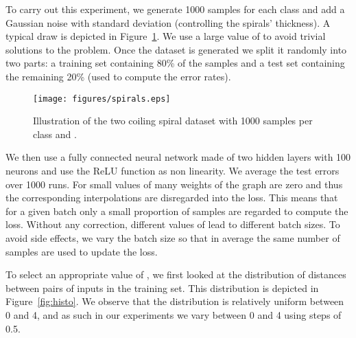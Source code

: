 \documentclass[twoside]{article}
\numberwithin{intassumption}{assumption}
\begin{document}
To carry out this experiment, we generate 1000 samples for each class and add a Gaussian noise with standard deviation  (controlling the spirals' thickness). A typical draw is depicted in Figure~\ref{fig:spirals}. We use a large value of  to avoid trivial solutions to the problem. Once the dataset is generated we split it randomly into two parts: a training set containing 80\% of the samples and a test set containing the remaining 20\% (used to compute the error rates).
\begin{figure}
    \centering
    \texttt{[image: figures/spirals.eps]}
    \caption{Illustration of the two coiling spiral dataset with 1000 samples per class and .}
    \label{fig:spirals}
\end{figure}
We then use a fully connected neural network made of two hidden layers with 100 neurons and use the ReLU function as non linearity. We average the test errors over 1000 runs. 
For small values of  many weights of the graph are zero and thus the corresponding interpolations are disregarded into the loss. This means that for a given batch only a small proportion of samples are regarded to compute the loss. Without any correction, different values of  lead to different batch sizes. To avoid side effects, we vary the batch size so that in average the same number of samples are used to update the loss.

To select an appropriate value of , we first looked at the distribution of distances between pairs of inputs in the training set. This distribution is depicted in Figure~\ref{fig:histo}. We observe that the distribution is relatively uniform between 0 and 4, and as such in our experiments we vary  between 0 and 4 using steps of 0.5.
\end{document}
